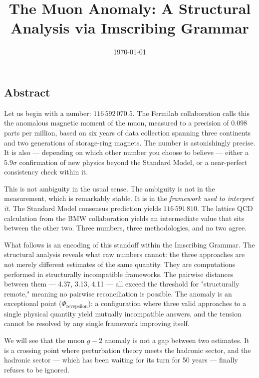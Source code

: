 \documentclass[12pt,a4paper]{article}
\begin{document}
\title{The Muon  Anomaly: A Structural Analysis via Imscribing Grammar}
\date{\today}

\maketitle

\begin{quote}
\end{quote}

\subsection{Abstract}

Let us begin with a number: $116\,592\,070.5$. The Fermilab collaboration calls this the anomalous magnetic moment of the muon, measured to a precision of 0.098 parts per million, based on six years of data collection spanning three continents and two generations of storage-ring magnets. The number is astonishingly precise. It is also --- depending on which other number you choose to believe --- either a $5.9\sigma$ confirmation of new physics beyond the Standard Model, or a near-perfect consistency check within it.

This is not ambiguity in the usual sense. The ambiguity is not in the measurement, which is remarkably stable. It is in the \emph{framework used to interpret it}. The Standard Model consensus prediction yields $116\,591\,810$. The lattice QCD calculation from the BMW collaboration yields an intermediate value that sits between the other two. Three numbers, three methodologies, and no two agree.

What follows is an encoding of this standoff within the Imscribing Grammar. The structural analysis reveals what raw numbers cannot: the three approaches are not merely different estimates of the same quantity. They are computations performed in structurally incompatible frameworks. The pairwise distances between them --- 4.37, 3.13, 4.11 --- all exceed the threshold for "structurally remote," meaning no pairwise reconciliation is possible. The anomaly is an exceptional point ($\Phi_{\text{revepsilon}}$): a configuration where three valid approaches to a single physical quantity yield mutually incompatible answers, and the tension cannot be resolved by any single framework improving itself.

We will see that the muon $g-2$ anomaly is not a gap between two estimates. It is a crossing point where perturbation theory meets the hadronic sector, and the hadronic sector --- which has been waiting for its turn for 50 years --- finally refuses to be ignored.
\end{document}

